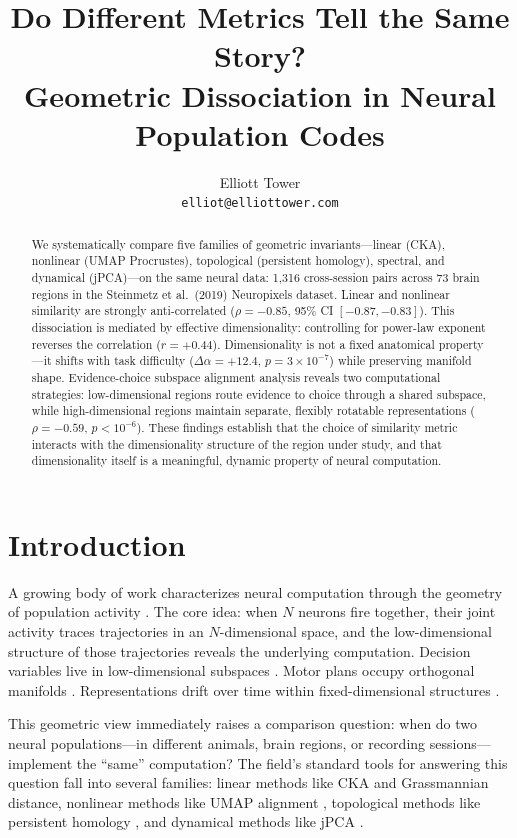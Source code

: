 \documentclass{article}
\title{Do Different Metrics Tell the Same Story? \\
Geometric Dissociation in Neural Population Codes}
\author{
Elliott Tower \\
\texttt{elliot@elliottower.com}
}
\begin{document}
\maketitle

\begin{abstract}
We systematically compare five families of geometric invariants---linear (CKA), nonlinear (UMAP Procrustes), topological (persistent homology), spectral, and dynamical (jPCA)---on the same neural data: 1,316 cross-session pairs across 73 brain regions in the Steinmetz et al.\ (2019) Neuropixels dataset. Linear and nonlinear similarity are strongly anti-correlated ($\rho = -0.85$, 95\% CI $[-0.87, -0.83]$). This dissociation is mediated by effective dimensionality: controlling for power-law exponent reverses the correlation ($r = +0.44$). Dimensionality is not a fixed anatomical property---it shifts with task difficulty ($\Delta\alpha = +12.4$, $p = 3 \times 10^{-7}$) while preserving manifold shape. Evidence-choice subspace alignment analysis reveals two computational strategies: low-dimensional regions route evidence to choice through a shared subspace, while high-dimensional regions maintain separate, flexibly rotatable representations ($\rho = -0.59$, $p < 10^{-6}$). These findings establish that the choice of similarity metric interacts with the dimensionality structure of the region under study, and that dimensionality itself is a meaningful, dynamic property of neural computation.
\end{abstract}

\section{Introduction}

A growing body of work characterizes neural computation through the geometry of population activity \citep{cunningham2014dimensionality, gallego2017neural}. The core idea: when $N$ neurons fire together, their joint activity traces trajectories in an $N$-dimensional space, and the low-dimensional structure of those trajectories reveals the underlying computation. Decision variables live in low-dimensional subspaces \citep{steinmetz2019distributed}. Motor plans occupy orthogonal manifolds \citep{gallego2017neural}. Representations drift over time within fixed-dimensional structures \citep{driscoll2022representational}.

This geometric view immediately raises a comparison question: when do two neural populations—in different animals, brain regions, or recording sessions—implement the ``same'' computation? The field's standard tools for answering this question fall into several families: linear methods like CKA \citep{kornblith2019similarity} and Grassmannian distance, nonlinear methods like UMAP alignment \citep{mcinnes2018umap}, topological methods like persistent homology \citep{rybakken2019decoding}, and dynamical methods like jPCA \citep{churchland2012neural}.
\end{document}
